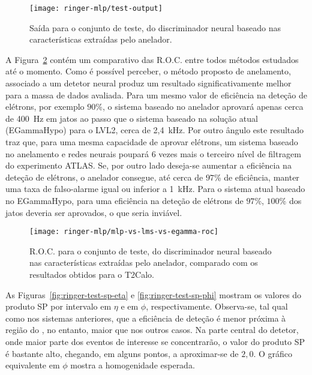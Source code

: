 \begin{figure}
\begin{center}
\texttt{[image: ringer-mlp/test-output]}
\end{center}
\caption{Saída para o conjunto de teste, do discriminador neural baseado nas
características extraídas pelo anelador.}
\label{fig:ringer-mlp-output}
\end{figure}

A Figura~\ref{fig:ringer-test-roc} contém um comparativo das R.O.C. entre
todos métodos estudados até o momento. Como é possível perceber, o método
proposto de anelamento, associado a um detetor neural produz um resultado
significativamente melhor para a massa de dados avaliada. Para um mesmo valor
de eficiência na deteção de elétrons, por exemplo $90$\%, o sistema baseado no
anelador aprovará apenas cerca de 400~Hz em jatos ao passo que o sistema
baseado na solução atual (EGammaHypo) para o LVL2, cerca de 2,4~kHz. Por outro
ângulo este resultado traz que, para uma mesma capacidade de aprovar elétrons,
um sistema baseado no anelamento e redes neurais poupará 6 vezes mais o
terceiro nível de filtragem do experimento ATLAS. Se, por outro lado deseja-se
aumentar a eficiência na deteção de elétrons, o anelador consegue, até cerca
de $97$\% de eficiência, manter uma taxa de falso-alarme igual ou inferior a
1~kHz. Para o sistema atual baseado no EGammaHypo, para uma eficiência na
deteção de elétrons de $97$\%, $100$\% dos jatos deveria ser aprovados, o que
seria inviável.

\begin{figure}
\begin{center}
\texttt{[image: ringer-mlp/mlp-vs-lms-vs-egamma-roc]}
\end{center}
\caption{R.O.C. para o conjunto de teste, do discriminador neural baseado nas
características extraídas pelo anelador, comparado com os resultados obtidos
para o T2Calo.}
\label{fig:ringer-test-roc}
\end{figure}

As Figuras~\ref{fig:ringer-test-sp-eta} e \ref{fig:ringer-test-sp-phi} mostram
os valores do produto SP por intervalo em $\eta$ e em $\phi$,
respectivamente. Observa-se, tal qual como nos sistemas anteriores, que a
eficiência de deteção é menor próxima à região do , no entanto,
maior que nos outros casos. Na parte central do detetor, onde maior parte dos
eventos de interesse se concentrarão, o valor do produto SP é bastante alto,
chegando, em alguns pontos, a aproximar-se de $2,0$. O gráfico equivalente em
$\phi$ mostra a homogenidade esperada.

